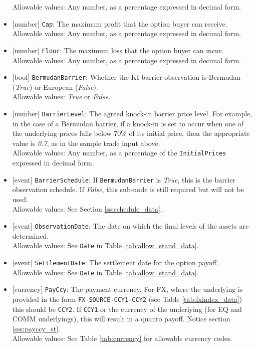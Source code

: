 \begin{itemize}
  Allowable values: Any number, as a percentage expressed in decimal form.
  \item{}[number] \lstinline!Cap!: The maximum profit that the option buyer can receive. \\
  Allowable values: Any number, as a percentage expressed in decimal form.
  \item{}[number] \lstinline!Floor!: The maximum loss that the option buyer can incur. \\
  Allowable values: Any number, as a percentage expressed in decimal form.
  \item{}[bool] \lstinline!BermudanBarrier!: Whether the KI barrier observation is Bermudan (\emph{True}) or European
  (\emph{False}). \\
  Allowable values: \emph{True} or \emph{False}.
  \item{}[number] \lstinline!BarrierLevel!: The agreed knock-in barrier price level. For example, in the case of a Bermudan barrier, if a knock-in is set to occur when one of the underlying prices falls below 70\% of its initial price, then the appropriate value is \emph{0.7}, as in the sample trade input above. \\
  Allowable values: Any number, as a percentage of the \lstinline!InitialPrices! expressed in decimal form.
  \item{}[event] \lstinline!BarrierSchedule!: If \lstinline!BermudanBarrier! is \emph{True}, this is the barrier observation
  schedule. If \emph{False}, this sub-node is still required but will not be used. \\
  Allowable values: See Section \ref{ss:schedule_data}.
  \item{}[event] \lstinline!ObservationDate!: The date on which the final levels of the assets are determined. \\
  Allowable values: See \lstinline!Date! in Table \ref{tab:allow_stand_data}.
  \item{}[event] \lstinline!SettlementDate!: The settlement date for the option payoff. \\
  Allowable values: See \lstinline!Date! in Table \ref{tab:allow_stand_data}.
  \item{}[currency] \lstinline!PayCcy!: The payment currency. For FX, where the underlying is provided
      in the form \lstinline!FX-SOURCE-CCY1-CCY2! (see Table \ref{tab:fxindex_data}) this should
      be \lstinline!CCY2!. If \lstinline!CCY1! or the currency of the underlying (for EQ and
      COMM underlyings), this will result in a quanto payoff. Notice section \ref{sss:payccy_st}. \\
        Allowable values: See Table \ref{tab:currency} for allowable currency codes.
\end{itemize}

